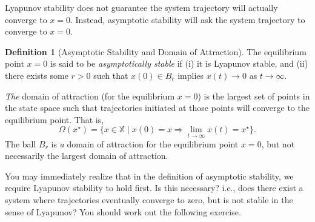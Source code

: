 \documentclass[
]{book}
\theoremstyle{definition}
\newtheorem{definition}{Definition}[chapter]
\theoremstyle{definition}
\theoremstyle{definition}
\theoremstyle{definition}
\theoremstyle{remark}
\begin{document}
Lyapunov stability does not guarantee the system trajectory will actually converge to \(x =0\). Instead, asymptotic stability will ask the system trajectory to converge to \(x=0\).

\begin{definition}[Asymptotic Stability and Domain of Attraction]
\protect\hypertarget{def:asymptoticstability}{}\label{def:asymptoticstability}The equilibrium point \(x = 0\) is said to be \emph{asymptotically stable} if (i) it is Lyapunov stable, and (ii) there exists some \(r > 0\) such that \(x(0) \in B_r\) implies \(x(t) \rightarrow 0\) as \(t \rightarrow \infty\).

\emph{The} domain of attraction (for the equilibrium \(x=0\)) is the largest set of points in the state space such that trajectories initiated at those points will converge to the equilibrium point. That is,
\[
\Omega(x^\star) = \{ x \in \mathbb{X} \mid x(0) = x \Longrightarrow \lim_{t \rightarrow \infty} x(t) = x^\star \}.
\]
The ball \(B_r\) is \emph{a} domain of attraction for the equilibrium point \(x=0\), but not necessarily the largest domain of attraction.
\end{definition}

You may immediately realize that in the definition of asymptotic stability, we require Lyapunov stability to hold first. Is this necessary? i.e., does there exist a system where trajectories eventually converge to zero, but is not stable in the sense of Lyapunov? You should work out the following exercise.
\end{document}
